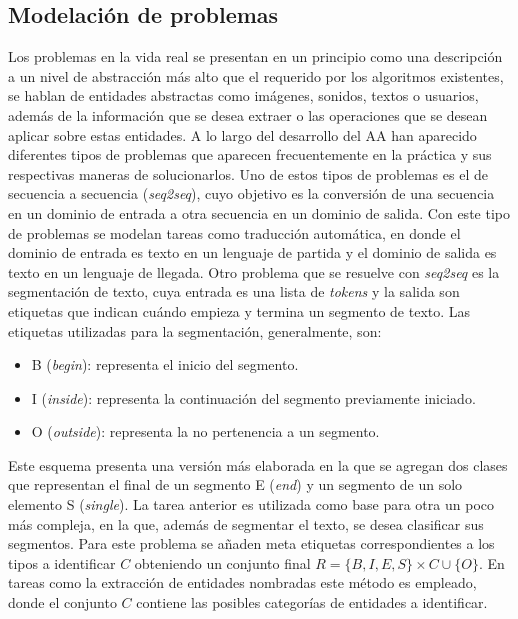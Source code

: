 \documentclass[a4paper,11pt,twocolumn,twoside]{article}
\begin{document}
\subsection{Modelación de problemas}

Los problemas en la vida real se presentan en un principio como una descripción a un nivel de abstracción 
más alto que el requerido por los algoritmos existentes, se hablan de entidades abstractas como imágenes,
sonidos, textos o usuarios, además de la información que se desea extraer o las operaciones que se
desean aplicar sobre estas entidades. A lo largo del desarrollo del AA han aparecido diferentes tipos de problemas 
que aparecen frecuentemente en la práctica y sus respectivas maneras de solucionarlos. Uno de estos tipos de problemas
es el de secuencia a secuencia (\textit{seq2seq}), cuyo objetivo es la conversión de una secuencia en un dominio de entrada a otra 
secuencia en un dominio de salida. Con este tipo de problemas se modelan tareas como traducción automática, en 
donde el dominio de entrada es texto en un lenguaje de partida y el dominio de salida es texto en un lenguaje de llegada.
Otro problema que se resuelve con \textit{seq2seq} es la segmentación de texto, cuya entrada es una lista de \textit{tokens}
y la salida son etiquetas que indican cuándo empieza y termina un segmento de texto. Las etiquetas utilizadas para 
la segmentación, generalmente, son:

\begin{itemize}
	\item B (\textit{begin}): representa el inicio del segmento.
	\item I (\textit{inside}): representa la continuación del segmento previamente iniciado.
	\item O (\textit{outside}): representa la no pertenencia a un segmento.
\end{itemize}

Este esquema presenta una versión más elaborada en la que se agregan dos clases que representan el final 
de un segmento E (\textit{end}) y un segmento de un solo elemento S (\textit{single}). La tarea anterior es 
utilizada como base para otra un poco más compleja, en la que, además de segmentar el texto, se desea 
clasificar sus segmentos. Para este problema se añaden meta etiquetas correspondientes a los tipos a identificar $C$
obteniendo un conjunto final $R = \{ B, I, E, S \} \times C \cup \{ O \}$. En tareas como la extracción de entidades
nombradas este método es empleado, donde el conjunto $C$ contiene las posibles categorías de entidades a identificar.
\end{document}

